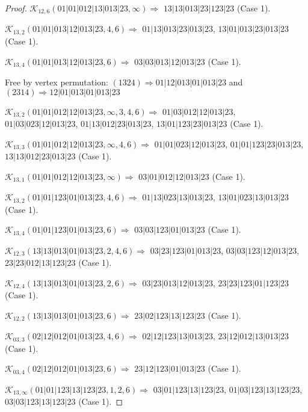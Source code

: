 \documentclass[12pt]{article}
\theoremstyle{plain}
\theoremstyle{definition}
\theoremstyle{remark}
\newcommand{\fancy}[1]{\mathcal{#1}}
\def\K{\fancy{K}}
\begin{document}
\begin{proof}
	$\K_{12,6}(01|01|012|13|013|23,\infty)\Rightarrow $ $13|13|013|23|123|23$ (Case 1).
	
	
	\bigskip
	
	$\K_{13,2}(01|01|013|12|013|23,4, 6)\Rightarrow $ $01|13|013|23|013|23$, $13|01|013|23|013|23$ (Case 1).
	
	$\K_{13,4}(01|01|013|12|013|23,6)\Rightarrow $ $03|03|013|12|013|23$ (Case 1).
	
	
	
	Free by vertex permutation: $(1 3 2 4)\Rightarrow 01|12|013|01|013|23$ and $(2 3 1 4)\Rightarrow 12|01|013|01|013|23$
	
	
	
	\bigskip
	
	$\K_{13,2}(01|01|012|12|013|23,\infty,3, 4, 6)\Rightarrow $ $01|03|012|12|013|23$, $01|03|023|12|013|23$, $01|13|012|23|013|23$, $13|01|123|23|013|23$ (Case 1).
	
	$\K_{13,3}(01|01|012|12|013|23,\infty,4, 6)\Rightarrow $ $01|01|023|12|013|23$, $01|01|123|23|013|23$, $13|13|012|23|013|23$ (Case 1).
	
	$\K_{13,1}(01|01|012|12|013|23,\infty)\Rightarrow $ $03|01|012|12|013|23$ (Case 1).
	
	
	\bigskip
	
	$\K_{13,2}(01|01|123|01|013|23,4, 6)\Rightarrow $ $01|13|023|13|013|23$, $13|01|023|13|013|23$ (Case 1).
	
	$\K_{13,4}(01|01|123|01|013|23,6)\Rightarrow $ $03|03|123|01|013|23$ (Case 1).
	
	
	\bigskip
	
	$\K_{12,3}(13|13|013|01|013|23,2, 4, 6)\Rightarrow $ $03|23|123|01|013|23$, $03|03|123|12|013|23$, $23|23|012|13|123|23$ (Case 1).
	
	$\K_{12,4}(13|13|013|01|013|23,2, 6)\Rightarrow $ $03|23|013|12|013|23$, $23|23|123|01|123|23$ (Case 1).
	
	$\K_{12,2}(13|13|013|01|013|23,6)\Rightarrow $ $23|02|123|13|123|23$ (Case 1).
	
	
	\bigskip
	
	$\K_{03,3}(02|12|012|01|013|23,4, 6)\Rightarrow $ $02|12|123|13|013|23$, $23|12|012|13|013|23$ (Case 1).
	
	$\K_{03,4}(02|12|012|01|013|23,6)\Rightarrow $ $23|12|123|01|013|23$ (Case 1).
	
	
	\bigskip
	
	$\K_{13,\infty}(01|01|123|13|123|23,1, 2, 6)\Rightarrow $ $03|01|123|13|123|23$, $01|03|123|13|123|23$, $03|03|123|13|123|23$ (Case 1).
	

\end{proof}
\end{document}
